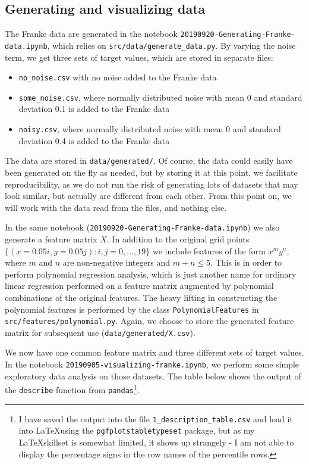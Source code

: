 \documentclass{article}
\begin{document}
\subsection{Generating and visualizing data}
The Franke data are generated in the notebook \texttt{20190920-Generating-Franke-data.ipynb}, which relies on \texttt{src/data/generate\_data.py}. By varying the noise term, we get three sets of target values, which are stored in separate files:
\begin{itemize}
    \item \texttt{no\_noise.csv} with no noise added to the Franke data
    \item \texttt{some\_noise.csv}, where normally distributed noise with mean 0 and standard deviation 0.1 is added to the Franke data
    \item \texttt{noisy.csv}, where normally distributed noise with mean 0 and standard deviation 0.4 is added to the Franke data
\end{itemize}
The data are stored in \texttt{data/generated/}. Of course, the data could easily have been generated on the fly as needed, but by storing it at this point, we facilitate reproducibility, as we do not run the risk of generating lots of datasets that may look similar, but actually are different from each other. From this point on, we will work with the data read from the files, and nothing else.

In the same notebook (\texttt{20190920-Generating-Franke-data.ipynb}) we also generate a feature matrix $X$. In addition to the original grid points $\{(x=0.05i, y=0.05j): i, j = 0, ..., 19\}$ we include features of the form $x^m y^{n}$, where $m$ and $n$ are non-negative integers and $m+n \leq 5$. This is in order to perform polynomial regression analysis, which is just another name for ordinary linear regression performed on a feature matrix augmented by polynomial combinations of the original features. The heavy lifting in constructing the polynomial features is performed by the class \texttt{PolynomialFeatures} in \texttt{src/features/polynomial.py}. Again, we choose to store the generated feature matrix for subsequent use (\texttt{data/generated/X.csv}).

We now have one common feature matrix and three different sets of target values. In the notebook \texttt{20190905-visualizing-franke.ipynb}, we perform some simple exploratory data analysis on those datasets. The table below shows the output of the \texttt{describe} function from \texttt{pandas}\footnote{I have saved the output into the file \texttt{1\_description\_table.csv} and load it into \LaTeX using the \texttt{pgfplotstabletypeset} package, but as my \LaTeX skillset is somewhat limited, it shows up strangely - I am not able to display the percentage signs in the row names of the percentile rows.}.
\end{document}
